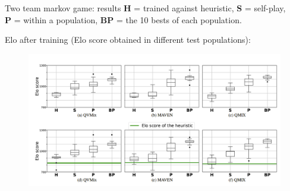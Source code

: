 \documentclass[9pt, hyperref={pdfusetitle,colorlinks=true,allcolors=DarkBlue}]{beamer}
\begin{document}
\begin{frame}{Two team markov game: results}
\textbf{H} = trained against heuristic,
\textbf{S} = self-play,\\
\textbf{P} = within a population,
\textbf{BP} = the 10 bests of each population.

Elo after training (Elo score obtained in different test populations):
    \begin{figure}
        \centering
        \includegraphics[width=\textwidth]{2team1.png}
    \end{figure}
\end{frame}
\end{document}
